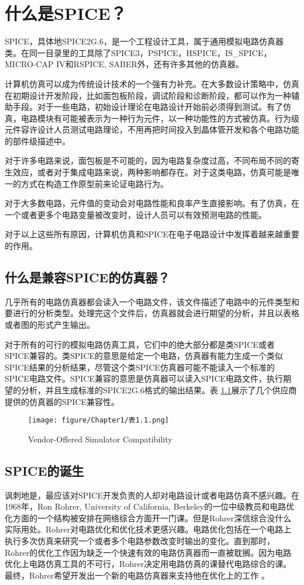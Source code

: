 \chapter{什么是SPICE？}
SPICE，具体地SPICE2G.6，是一个工程设计工具，属于通用模拟电路仿真器类。在同一目录里的工具除了SPICE3，PSPICE，HSPICE，IS\_{SPICE}，MICRO-CAP IV和RSPICE, SABER外，还有许多其他的仿真器。

计算机仿真可以成为传统设计技术的一个强有力补充。在大多数设计策略中，仿真在初期设计开发阶段，比如面包板阶段，调试阶段和诊断阶段，都可以作为一种辅助手段。对于一些电路，初始设计理论在电路设计开始前必须得到测试。有了仿真，电路模块有可能被表示为一种行为元件，以一种功能性的方式被仿真。行为级元件容许设计人员测试电路理论，不用再把时间投入到晶体管开发和各个电路功能的部件级描述中。

对于许多电路来说，面包板是不可能的，因为电路复杂度过高，不同布局不同的寄生效应，或者对于集成电路来说，两种影响都存在。对于这类电路，仿真可能是唯一的方式在构造工作原型前来论证电路行为。

对于大多数电路，元件值的变动会对电路性能和良率产生直接影响。有了仿真，在一个或者更多个电路变量被改变时，设计人员可以有效预测电路的性能。

对于以上这些所有原因，计算机仿真和SPICE在电子电路设计中发挥着越来越重要的作用。

\section{什么是兼容SPICE的仿真器？}
几乎所有的电路仿真器都会读入一个电路文件，该文件描述了电路中的元件类型和要进行的分析类型。处理完这个文件后，仿真器就会进行期望的分析，并且以表格或者图的形式产生输出。

对于所有的可行的模拟电路仿真工具，它们中的绝大部分都是类SPICE或者SPICE兼容的。类SPICE的意思是给定一个电路，仿真器有能力生成一个类似SPICE结果的分析结果，尽管这个类SPICE仿真器可能不能读入一个标准的SPICE电路文件。SPICE兼容的意思是仿真器可以读入SPICE电路文件，执行期望的分析，并且生成标准的SPICE2G.6格式的输出结果。表 \ref{表1.1}展示了几个供应商提供的仿真器的SPICE兼容性。
\begin{figure}[htbp]
\small
    \centering
    \texttt{[image: figure/Chapter1/表1.1.png]}
    \caption{Vendor-Offered Simulator Compatibility}
    \label{表1.1}
\end{figure}

\section{SPICE的诞生}
讽刺地是，最应该对SPICE开发负责的人却对电路设计或者电路仿真不感兴趣。在1968年，Ron Rohrer, University of California, Berkeley的一位中级教员和电路优化方面的一个结构被安排在网络综合方面开一门课。但是Rohrer深信综合没什么实际用处。Rohrer对电路优化和优化技术更感兴趣。电路优化包括在一个电路上执行多次仿真来研究一个或者多个电路参数改变时输出的变化。直到那时，Rohrer的优化工作因为缺乏一个快速有效的电路仿真器而一直被耽搁。因为电路优化上电路仿真工具的不可行，Rohrer决定用电路仿真的课替代电路综合的课。最终，Rohrer希望开发出一个新的电路仿真器来支持他在优化上的工作 \cite{136783}。

